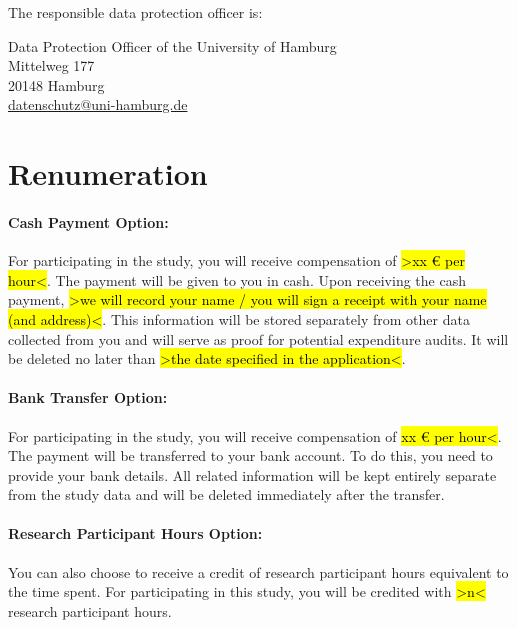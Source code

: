 \documentclass[11pt,twoside,a4paper]{article}
\begin{document}
The responsible data protection officer is:

Data Protection Officer of the University of Hamburg\\
Mittelweg 177\\
20148 Hamburg\\
\href{mailto:datenschutz@uni-hamburg.de}{datenschutz@uni-hamburg.de}

\section{Renumeration}
\label{sec:renumeration}

\paragraph{Cash Payment Option:}

For participating in the study, you will receive compensation of \hl{>xx \euro{} per hour<}.
The payment will be given to you in cash.
Upon receiving the cash payment, \hl{>we will record your name / you will sign a receipt with your name (and address)<}.
This information will be stored separately from other data collected from you and will serve as proof for potential expenditure audits.
It will be deleted no later than \hl{>the date specified in the application<}.

\paragraph{Bank Transfer Option:}

For participating in the study, you will receive compensation of \hl{xx \euro{}  per hour<}.
The payment will be transferred to your bank account.
To do this, you need to provide your bank details.
All related information will be kept entirely separate from the study data and will be deleted immediately after the transfer.

\paragraph{Research Participant Hours Option:}

You can also choose to receive a credit of research participant hours equivalent to the time spent.
For participating in this study, you will be credited with \hl{>n<} research participant hours.
\end{document}
